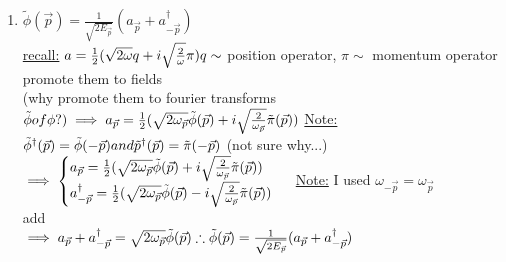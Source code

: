 \documentclass[12pt]{amsart}
\begin{document}
\begin{enumerate}
\item  \underline{ $\tilde{\phi}( \vec{p}) = \frac{1}{\sqrt{2 E_{\vec{p}}}}( a_{\vec{p}} + a_{- \vec{p}}^{\dagger})$}\\
\underline{recall:} $a = \frac{1}{2} ( \sqrt{2 \omega} q + i \sqrt{ \frac{2}{\omega}} \pi)\\
q \sim$ position operator,$\,\, \pi \sim$ momentum operator\\
promote them to fields\\
(why promote them to fourier transforms $\tilde{\phi} of \phi?)\\
\implies a_{\vec{p}} = \frac{1}{2} ( \sqrt{ 2 \omega_{\vec{p}}} \tilde{\phi}(\vec{p}) + i \sqrt{ \frac{2}{\omega_{\vec{p}}} }\tilde{\pi}(\vec{p}))\\$
\underline{Note:} $\tilde{\phi}^{\dagger}(\vec{p}) = \tilde{\phi}(- \vec{p}) and \tilde{p}^{\dagger}( \vec{p}) = \tilde{\pi}( - \vec{p})\\$
(not sure why...)\\
$\implies 
\begin{cases}
a_{\vec{p}} = \frac{1}{2} ( \sqrt{2 \omega_{\vec{p}}} \tilde{\phi}( \vec{p})+ i \sqrt{ \frac{2}{\omega_{\vec{p}}}} \tilde{\pi} ( \vec{p}))\\
a_{- \vec{p}}^{\dagger} = \frac{1}{2} ( \sqrt{2 \omega_{\vec{p}}} \tilde{\phi}( \vec{p}) - i \sqrt{ \frac{2}{ \omega_{\vec{p}}}} \tilde{\pi}( \vec{p}))\\
\end{cases}\\
 $
\underline{Note:} I used $\omega_{- \vec{p}} = \omega_{\vec{p}}$\\
add \\
$\implies a_{\vec{p}} + a_{- \vec{p}}^{\dagger} = \sqrt{2 \omega_{\vec{p}} }\tilde{\phi}( \vec{p})\\
\therefore \tilde{\phi}(\vec{p}) = \frac{1}{\sqrt{2 E_{\vec{p}}}} ( a_{\vec{p}} + a_{- \vec{p}}^{\dagger})\\$


\hdashrule[0.5ex][c]{\linewidth}{0.5pt}{1.5mm}



\end{enumerate}
\end{document}

